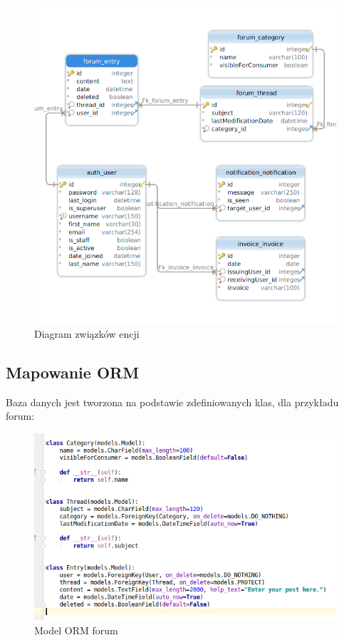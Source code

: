 \documentclass[12pt]{article}
\begin{document}
\begin{figure}[H]
	\centering
		\includegraphics[scale=0.8]{img/sqlite.png}
	\caption{Diagram związków encji}
	\label{}
\end{figure}

\subsection{Mapowanie ORM}
Baza danych jest tworzona na podstawie zdefiniowanych klas, dla przykładu forum:
\begin{figure}[H]
	\centering
	\includegraphics[scale=0.7]{img/c_forum_model.png}
	\caption{Model ORM forum}
\end{figure}
\end{document}

